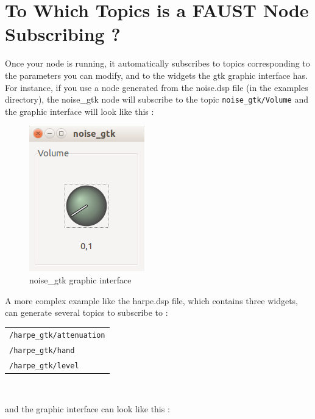 \section{To Which Topics is a FAUST Node Subscribing ?}
Once your \faust node is running, it automatically subscribes to topics corresponding to the parameters you can modify, and to the widgets the gtk graphic interface has. For instance, if you use a \faust node generated from the noise.dsp file (in the examples directory), the noise\_gtk node will subscribe to the topic \lstinline'noise_gtk/Volume' and the graphic interface will look like this :
\begin{figure}[ht!]
\centering
\begin{adjustbox}{minipage=5cm,margin=0pt 10pt,bgcolor=roscolor}
\centering
\includegraphics[scale=0.5]{images/noise_gtk.png}
\end{adjustbox}
\caption{noise\_gtk graphic interface}
\label{fig:noise_gtk}

\end{figure}
\newpage
A more complex example like the harpe.dsp file, which contains three widgets, can generate several topics to subscribe to :
\\
\begin{center}

\begin{tabular}{l}
	\lstinline'/harpe_gtk/attenuation' \\
	\lstinline'/harpe_gtk/hand' \\
	\lstinline'/harpe_gtk/level' \\
\end{tabular}\\
\end{center}
and the graphic interface can look like this :

